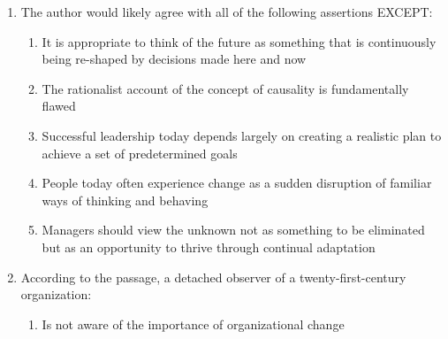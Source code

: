 \documentclass[12pt]{article}
\begin{document}
\begin{enumerate}[label=\textbf{\arabic*.}]
\begin{multicols}{2}
\begin{enumerate}[label=(\Alph*)]
\item Advocate a new way of viewing change

\item Identify a set of concrete principles for managing change

\item Explain a technique for reducing uncertainty in a rapidly changing environment

\end{enumerate}

\end{multicols}

\item The author would likely agree with all of the following assertions EXCEPT:

\begin{multicols}{2}

\begin{enumerate}[label=(\Alph*)]

\item It is appropriate to think of the future as something that is continuously being re-shaped by decisions made here and now

\item The rationalist account of the concept of causality is fundamentally flawed

\item Successful leadership today depends largely on creating a realistic plan to achieve a set of predetermined goals

\item People today often experience change as a sudden disruption of familiar ways of thinking and behaving

\item Managers should view the unknown not as something to be eliminated but as an opportunity to thrive through continual adaptation

\end{enumerate}

\end{multicols}

\item According to the passage, a detached observer of a twenty-first-century organization:

\begin{multicols}{2}

\begin{enumerate}[label=(\Alph*)]

\item Is not aware of the importance of organizational change


\end{enumerate}
\end{multicols}
\end{enumerate}
\end{document}
